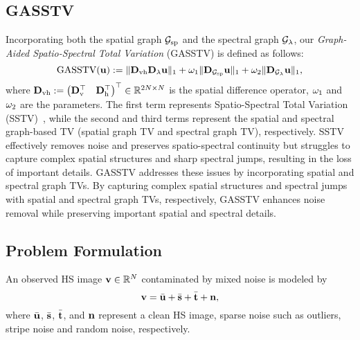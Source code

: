 \subsection{GASSTV}
\label{subsec:GASSTV}
Incorporating both the spatial graph $\mathcal{G}_{\text{sp}}$ and the spectral graph $\mathcal{G}_{\lambda}$, our \textit{Graph-Aided Spatio-Spectral Total Variation} (GASSTV) is defined as follows:
\begin{equation}
    \label{eq:GASSTV}
    \text{GASSTV}(\mathbf{u}) := \| \mathbf{D}_{\text{vh}} \mathbf{D}_{\lambda} \mathbf{u}\|_{1} + \omega_{1} \| \mathbf{D}_{\mathcal{G}_{\text{sp}}} \mathbf{u} \|_{1} + \omega_{2} \| \mathbf{D}_{\mathcal{G}_{\lambda}} \mathbf{u} \|_{1},
\end{equation}
where $\mathbf{D}_{\text{vh}} := \begin{pmatrix} \mathbf{D}_{\text{v}}^{\top} & \mathbf{D}_{\text{h}}^{\top} \end{pmatrix}^{\top} \in \mathbb{R}^{2 N \times N}$ is the spatial difference operator, $\omega_{1}$ and $\omega_{2}$ are the parameters.
The first term represents Spatio-Spectral Total Variation (SSTV)~\cite{Aggarwal2016SSTV}, while the second and third terms represent the spatial and spectral graph-based TV (spatial graph TV and spectral graph TV), respectively.
SSTV effectively removes noise and preserves spatio-spectral continuity but struggles to capture complex spatial structures and sharp spectral jumps, resulting in the loss of important details.
GASSTV addresses these issues by incorporating spatial and spectral graph TVs.
By capturing complex spatial structures and spectral jumps with spatial and spectral graph TVs, respectively, GASSTV enhances noise removal while preserving important spatial and spectral details.


\subsection{Problem Formulation}
\label{subsec:ProbForm}
An observed HS image $\mathbf{v} \in \mathbb{R}^{N}$ contaminated by mixed noise is modeled by
\begin{equation}
    \label{eq:ObsvModel}
    \mathbf{v} = \bar{\mathbf{u}} + \bar{\mathbf{s}} + \bar{\mathbf{t}} + \mathbf{n},
\end{equation}
where $\bar{\mathbf{u}}$, $\bar{\mathbf{s}}$, $\bar{\mathbf{t}}$, and $\mathbf{n}$ represent a clean HS image, sparse noise such as outliers, stripe noise and random noise, respectively. %

